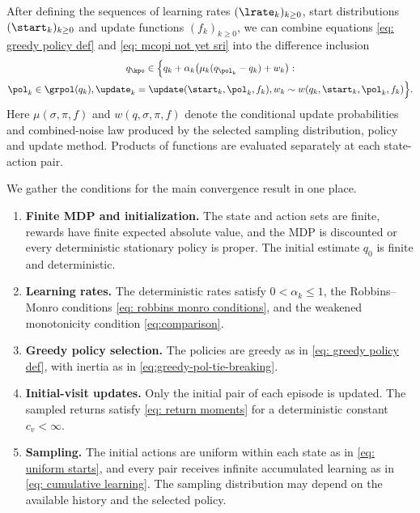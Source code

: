 After defining the sequences of learning rates $(\lrate_k)_{k \ge 0}$, start distributions $(\start_k)_{k \ge 0}$ and update functions $(f_k)_{k \ge 0}$,
we can combine equations \eqref{eq: greedy policy def} and \eqref{eq: mcopi not yet sri} into the difference inclusion
\begin{multline}
\label{eq: mcopi sa}
    q_\kpo
    \in
    \Big\{ q_k + \alpha_k \big( \mu_k(q_{\pol_k} - q_k) + w_k \big) 
    :
    \\
    \pol_k \in \grpol(q_k),
    \update_k = \update(\start_k, \pol_k, f_k),
    w_k \sim w(q_k, \start_k, \pol_k, f_k)
    \Big\} .
\end{multline}
Here $\mu(\sigma,\pi,f)$ and $w(q,\sigma,\pi,f)$ denote the conditional update probabilities and combined-noise law produced by the selected sampling distribution, policy and update method. Products of functions are evaluated separately at each state-action pair.

We gather the conditions for the main convergence result in one place.

\begin{assumption}
\label{asp: standing}
\phantom{Assume}
\begin{enumerate}[label=(\arabic*)]
\item \textbf{Finite MDP and initialization.} The state and action sets are finite, rewards have finite expected absolute value, and the MDP is discounted or every deterministic stationary policy is proper. The initial estimate $q_0$ is finite and deterministic.
\item \textbf{Learning rates.} The deterministic rates satisfy $0<\alpha_k\le1$, the Robbins--Monro conditions \eqref{eq: robbins monro conditions}, and the weakened monotonicity condition \eqref{eq:comparison}.
\item \textbf{Greedy policy selection.} The policies are greedy as in \eqref{eq: greedy policy def}, with inertia as in \eqref{eq:greedy-pol-tie-breaking}.
\item \textbf{Initial-visit updates.} Only the initial pair of each episode is updated. The sampled returns satisfy \eqref{eq: return moments} for a deterministic constant $c_v<\infty$.
\item \textbf{Sampling.} The initial actions are uniform within each state as in \eqref{eq: uniform starts}, and every pair receives infinite accumulated learning as in \eqref{eq: cumulative learning}. The sampling distribution may depend on the available history and the selected policy.
\end{enumerate}
\end{assumption}

